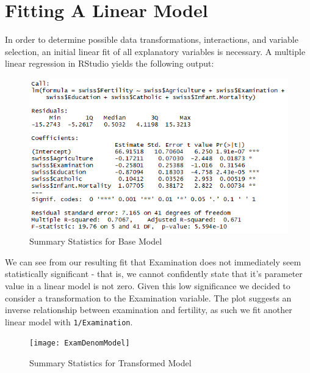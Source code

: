 \documentclass[preprint,12pt]{elsarticle}
\begin{document}
\newpage
\section*{Fitting A Linear Model}

In order to determine possible data transformations, interactions, and variable selection, an initial linear fit of all explanatory variables is necessary. A multiple linear regression in RStudio yields the following output:

\begin{figure}[h!]
\centering\includegraphics[width=0.8\linewidth]{SummaryBaseModel}
\caption{Summary Statistics for Base Model}
\end{figure}

We can see from our resulting fit that Examination does not immediately seem statistically significant - that is, we cannot confidently state that it's parameter value in a linear model is not zero. Given this low significance we decided to consider a transformation to the Examination variable. The plot suggests an inverse relationship between examination and fertility, as such we fit another linear model with \texttt{1/Examination}. 

\begin{figure}[h!]
\centering\texttt{[image: ExamDenomModel]}
\caption{Summary Statistics for Transformed Model}
\end{figure}










\end{document}
